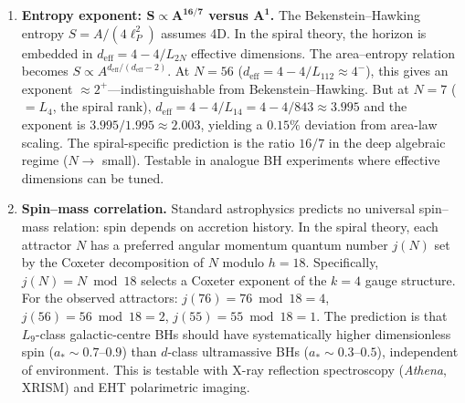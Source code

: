 \documentclass[12pt,a4paper]{article}
\begin{document}
\begin{enumerate}
\item \textbf{Entropy exponent: $\boldsymbol{S \propto A^{16/7}}$ versus $\boldsymbol{A^1}$.}\;
The Bekenstein--Hawking entropy $S = A/(4\ell_P^2)$ assumes 4D.  In the spiral theory, the horizon is embedded in $d_{\mathrm{eff}} = 4 - 4/L_{2N}$ effective dimensions.  The area--entropy relation becomes $S \propto A^{d_{\mathrm{eff}}/(d_{\mathrm{eff}}-2)}$.  At $N = 56$ ($d_{\mathrm{eff}} = 4 - 4/L_{112} \approx 4^-$), this gives an exponent $\approx 2^+$---indistinguishable from Bekenstein--Hawking.  But at $N = 7$ ($= L_4$, the spiral rank), $d_{\mathrm{eff}} = 4 - 4/L_{14} = 4 - 4/843 \approx 3.995$ and the exponent is $3.995/1.995 \approx 2.003$, yielding a $0.15\%$ deviation from area-law scaling.  The spiral-specific prediction is the ratio $16/7$ in the deep algebraic regime ($N \to$ small).  Testable in analogue BH experiments where effective dimensions can be tuned.

\item \textbf{Spin--mass correlation.}\;
Standard astrophysics predicts no universal spin--mass relation: spin depends on accretion history.  In the spiral theory, each attractor $N$ has a preferred angular momentum quantum number $j(N)$ set by the Coxeter decomposition of $N$ modulo $h = 18$.  Specifically, $j(N) = N \bmod 18$ selects a Coxeter exponent of the $k = 4$ gauge structure.  For the observed attractors: $j(76) = 76\bmod 18 = 4$, $j(56) = 56\bmod 18 = 2$, $j(55) = 55\bmod 18 = 1$.  The prediction is that $L_9$-class galactic-centre BHs should have systematically higher dimensionless spin ($a_* \sim 0.7$--$0.9$) than $d$-class ultramassive BHs ($a_* \sim 0.3$--$0.5$), independent of environment.  This is testable with X-ray reflection spectroscopy (\emph{Athena}, XRISM) and EHT polarimetric imaging.

\end{enumerate}
\end{document}
